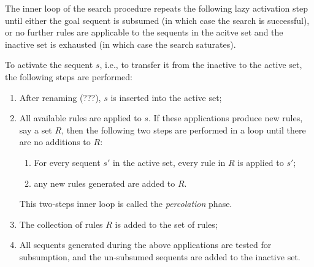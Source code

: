 \documentclass{article}
\theoremstyle{definition}
\begin{document}
The inner loop of the search procedure repeats the following lazy activation
step until either the goal sequent is subsumed (in which case the search is
successful), or no further rules are applicable to the sequents in the acitve
set and the inactive set is exhausted (in which case the search saturates).

\begin{definition}
  To activate the sequent $s$, i.e., to transfer it from the inactive to the
  active set, the following steps are performed:

  \begin{enumerate}
  \item After renaming (???), $s$ is inserted into the active set;
  \item All available rules are applied to $s$. If these applications produce
    new rules, say a set $R$, then the following two steps are performed in a
    loop until there are no additions to $R$:

    \begin{enumerate}
    \item For every sequent $s'$ in the active set, every rule in $R$ is applied
      to $s'$;
    \item any new rules generated are added to $R$.
    \end{enumerate}

    This two-steps inner loop is called the \emph{percolation} phase.
  \item The collection of rules $R$ is added to the set of rules;
  \item All sequents generated during the above applications are tested for
    subsumption, and the un-subsumed sequents are added to the inactive set.
  \end{enumerate}
\end{definition}
\end{document}
